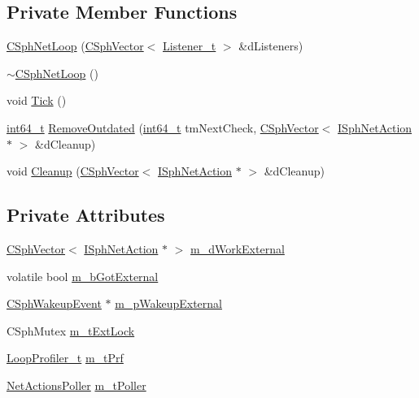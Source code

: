 \subsection*{Private Member Functions}
\begin{DoxyCompactItemize}
\item 
\hyperlink{classCSphNetLoop_a7b5014e679cddc6c4e3a6def4dff0271}{C\-Sph\-Net\-Loop} (\hyperlink{classCSphVector}{C\-Sph\-Vector}$<$ \hyperlink{structListener__t}{Listener\-\_\-t} $>$ \&d\-Listeners)
\item 
\hyperlink{classCSphNetLoop_ae6e0e20803d610c74f04d9985681d21c}{$\sim$\-C\-Sph\-Net\-Loop} ()
\item 
void \hyperlink{classCSphNetLoop_adea417f83046603d7506b6db306c4b5e}{Tick} ()
\item 
\hyperlink{sphinxstd_8h_a996e72f71b11a5bb8b3b7b6936b1516d}{int64\-\_\-t} \hyperlink{classCSphNetLoop_a8312e745b44a21cdb19bf44602dbf859}{Remove\-Outdated} (\hyperlink{sphinxstd_8h_a996e72f71b11a5bb8b3b7b6936b1516d}{int64\-\_\-t} tm\-Next\-Check, \hyperlink{classCSphVector}{C\-Sph\-Vector}$<$ \hyperlink{structISphNetAction}{I\-Sph\-Net\-Action} $\ast$ $>$ \&d\-Cleanup)
\item 
void \hyperlink{classCSphNetLoop_a4356fc3b4044d19fa49ce7c5a63516fe}{Cleanup} (\hyperlink{classCSphVector}{C\-Sph\-Vector}$<$ \hyperlink{structISphNetAction}{I\-Sph\-Net\-Action} $\ast$ $>$ \&d\-Cleanup)
\end{DoxyCompactItemize}
\subsection*{Private Attributes}
\begin{DoxyCompactItemize}
\item 
\hyperlink{classCSphVector}{C\-Sph\-Vector}$<$ \hyperlink{structISphNetAction}{I\-Sph\-Net\-Action} $\ast$ $>$ \hyperlink{classCSphNetLoop_ad3d1854c663606739d14dfd7f96782e0}{m\-\_\-d\-Work\-External}
\item 
volatile bool \hyperlink{classCSphNetLoop_aa36a2fe80bfd133e77af0f699c455f81}{m\-\_\-b\-Got\-External}
\item 
\hyperlink{classCSphWakeupEvent}{C\-Sph\-Wakeup\-Event} $\ast$ \hyperlink{classCSphNetLoop_af9d0995cce3f8a59434c126c6d8fa95d}{m\-\_\-p\-Wakeup\-External}
\item 
C\-Sph\-Mutex \hyperlink{classCSphNetLoop_a2ca32440d5457093b9c9f16d9ba724dd}{m\-\_\-t\-Ext\-Lock}
\item 
\hyperlink{structLoopProfiler__t}{Loop\-Profiler\-\_\-t} \hyperlink{classCSphNetLoop_a1d9f3234aaa76cf5121f0ceb12b47974}{m\-\_\-t\-Prf}
\item 
\hyperlink{classNetActionsPoller}{Net\-Actions\-Poller} \hyperlink{classCSphNetLoop_a15ed08f689873d6f9fa79ce8c0cb8fc7}{m\-\_\-t\-Poller}
\end{DoxyCompactItemize}



